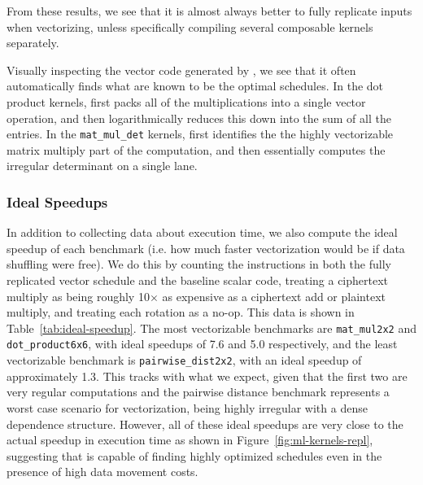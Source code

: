 
From these results, we see that it is almost always better to fully replicate inputs when vectorizing, unless specifically compiling several composable kernels separately.

Visually inspecting the vector code generated by \system, we see that it often automatically finds what are known to be the optimal schedules.
In the dot product kernels, \system first packs all of the multiplications into a single vector operation, and then logarithmically reduces this down into the sum of all the entries. 
In the \texttt{mat\_mul\_det} kernels, \system first identifies the the highly vectorizable matrix multiply part of the computation, and then essentially computes the irregular determinant on a single lane.


\subsubsection*{Ideal Speedups}
In addition to collecting data about execution time, we also compute the ideal speedup of each benchmark (i.e. how much faster vectorization would be if data shuffling were free).
We do this by counting the instructions in both the fully replicated vector schedule and the baseline scalar code, treating a ciphertext multiply as being roughly 10$\times$ as expensive as a ciphertext add or plaintext multiply, and treating each rotation as a no-op. 
This data is shown in Table~\ref{tab:ideal-speedup}.
The most vectorizable benchmarks are \texttt{mat\_mul2x2} and \texttt{dot\_product6x6}, with ideal speedups of 7.6 and 5.0 respectively, and the least vectorizable benchmark is \texttt{pairwise\_dist2x2}, with an ideal speedup of approximately 1.3.
This tracks with what we expect, given that the first two are very regular computations and the pairwise distance benchmark represents a worst case scenario for vectorization, being highly irregular with a dense dependence structure.
However, all of these ideal speedups are very close to the actual speedup in execution time as shown in Figure~\ref{fig:ml-kernels-repl}, suggesting that \system is capable of finding highly optimized schedules even in the presence of high data movement costs.


